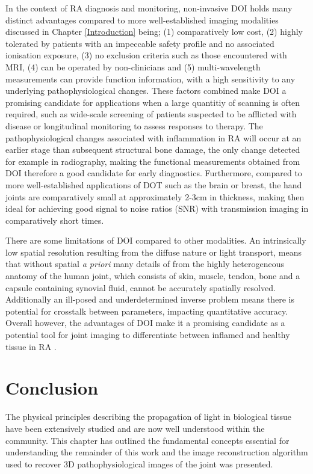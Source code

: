 \documentclass[twoside]{bhamthesis}
\theoremstyle{definition}
\begin{document}
In the context of RA diagnosis and monitoring, non-invasive DOI holds many distinct advantages compared to more well-established imaging modalities discussed in Chapter \ref{Introduction} being; (1) comparatively low cost, (2) highly tolerated by patients with an impeccable safety profile and no associated ionisation exposure, (3) no exclusion criteria such as those encountered with MRI, (4) can be operated by non-clinicians and (5) multi-wavelength measurements can provide function information, with a high sensitivity to any underlying pathophysiological changes. These factors combined make DOI a promising candidate for applications when a large quantitiy of scanning is often required, such as wide-scale screening of patients suspected to be afflicted with disease or longitudinal monitoring to assess responses to therapy. The pathophysiological changes associated with inflammation in RA will occur at an earlier stage than subsequent structural bone damage, the only change detected for example in radiography, making the functional measurements obtained from DOI therefore a good candidate for early diagnostics. Furthermore, compared to more well-established applications of DOT such as the brain or breast, the hand joints are comparatively small at approximately 2-3cm in thickness, making then ideal for achieving good signal to noise ratios (SNR) with transmission imaging in comparatively short times.

There are some limitations of DOI compared to other modalities. An intrinsically low spatial resolution resulting from the diffuse nature or light transport, means that without spatial \textit{a priori} many details of from the highly heterogeneous anatomy of the human joint, which consists of skin, muscle, tendon, bone and a capsule containing synovial fluid, cannot be accurately spatially resolved. Additionally an ill-posed and underdetermined inverse problem means there is potential for crosstalk between parameters, impacting quantitative accuracy. Overall however, the advantages of DOI make it a promising candidate as a potential tool for joint imaging to differentiate between inflamed and healthy tissue in RA \cite{golovko2011optical}. 

\section{Conclusion}

The physical principles describing the propagation of light in biological tissue have been extensively studied and are now well understood within the community. This chapter has outlined the fundamental concepts essential for understanding the remainder of this work and the image reconstruction algorithm used to recover 3D pathophysiological images of the joint was presented. 
\end{document}
